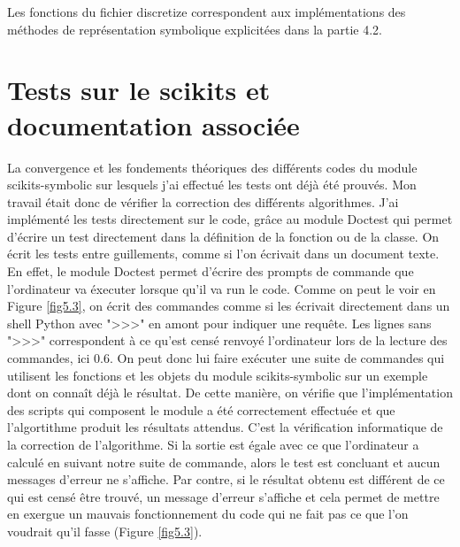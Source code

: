 \vspace{2ex}
Les fonctions du fichier discretize correspondent aux implémentations des méthodes de représentation symbolique explicitées dans la partie 4.2.

\section{Tests sur le scikits et documentation associée}

\vspace{2ex}
La convergence et les fondements théoriques des différents codes du module scikits-symbolic sur lesquels j'ai effectué les tests ont déjà été prouvés. Mon travail était donc de vérifier la correction des différents algorithmes. J'ai implémenté les tests directement sur le code, grâce au module Doctest qui permet d'écrire un test directement dans la définition de la fonction ou de la classe. On écrit les tests entre guillements, comme si l'on écrivait dans un document texte. En effet, le module Doctest permet d'écrire des prompts de commande que l'ordinateur va éxecuter lorsque qu'il va run le code. Comme on peut le voir en Figure \ref{fig5.3}, on écrit des commandes comme si les écrivait directement dans un shell Python avec ">>>" en amont pour indiquer une requête. Les lignes sans ">>>" correspondent à ce qu'est censé renvoyé l'ordinateur lors de la lecture des commandes, ici 0.6. On peut donc lui faire exécuter une suite de commandes qui utilisent les fonctions et les objets du module scikits-symbolic sur un exemple dont on connaît déjà le résultat. De cette manière, on vérifie que l'implémentation des scripts qui composent le module a été correctement effectuée et que l'algortithme produit les résultats attendus. C'est la vérification informatique de la correction de l'algorithme. Si la sortie est égale avec ce que l'ordinateur a calculé en suivant notre suite de commande, alors le test est concluant et aucun messages d'erreur ne s'affiche. Par contre, si le résultat obtenu est différent de ce qui est censé être trouvé, un message d'erreur s'affiche et cela permet de mettre en exergue un mauvais fonctionnement du code qui ne fait pas ce que l'on voudrait qu'il fasse (Figure \ref{fig5.3}).

